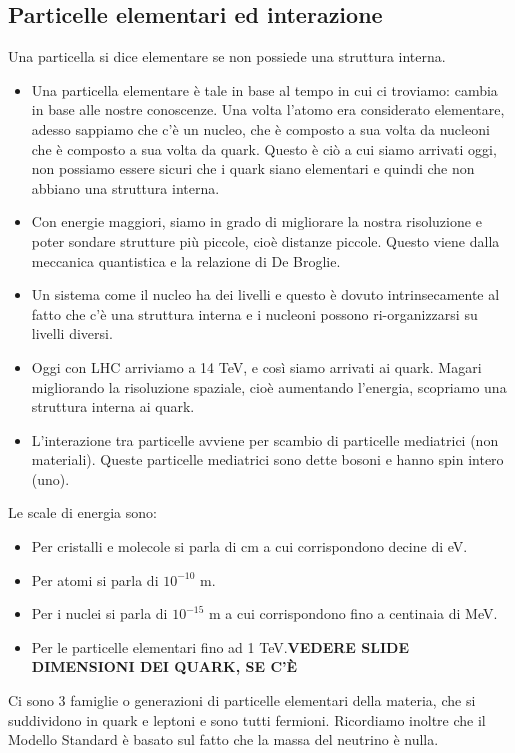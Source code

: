 \subsection{Particelle elementari ed interazione}
Una particella si dice elementare se non possiede una struttura interna. 
\begin{itemize}
    \item Una particella elementare è tale in base al tempo in cui ci troviamo: cambia in base alle nostre conoscenze. Una volta l'atomo era considerato elementare, adesso sappiamo che c'è un nucleo, che è composto a sua volta da nucleoni che è composto a sua volta da quark. Questo è ciò a cui siamo arrivati oggi, non possiamo essere sicuri che i quark siano elementari e quindi che non abbiano una struttura interna.
    \item Con energie maggiori, siamo in grado di migliorare la nostra risoluzione e poter sondare strutture più piccole, cioè distanze piccole. Questo viene dalla meccanica quantistica e la relazione di De Broglie. 
    \item Un sistema come il nucleo ha dei livelli e questo è dovuto intrinsecamente al fatto che c'è una struttura interna e i nucleoni possono ri-organizzarsi su livelli diversi.
    \item Oggi con LHC arriviamo a 14 TeV, e così siamo arrivati ai quark. Magari migliorando la risoluzione spaziale, cioè aumentando l'energia, scopriamo una struttura interna ai quark.
    \item L'interazione tra particelle avviene per scambio di particelle mediatrici (non materiali). Queste particelle mediatrici sono dette bosoni e hanno spin intero (uno).
\end{itemize}
Le scale di energia sono:
\begin{itemize}
    \item Per cristalli e molecole si parla di cm a cui corrispondono decine di eV.
    \item Per atomi si parla di $10^{-10}$ m.
    \item Per i nuclei si parla di $10^{-15}$ m a cui corrispondono fino a centinaia di MeV.
    \item Per le particelle elementari fino ad 1 TeV.\textbf{VEDERE SLIDE DIMENSIONI DEI QUARK, SE C'È}
\end{itemize}
Ci sono 3 famiglie o generazioni di particelle elementari della materia, che si suddividono in quark e leptoni e sono tutti fermioni. Ricordiamo inoltre che il Modello Standard è basato sul fatto che la massa del neutrino è nulla.
